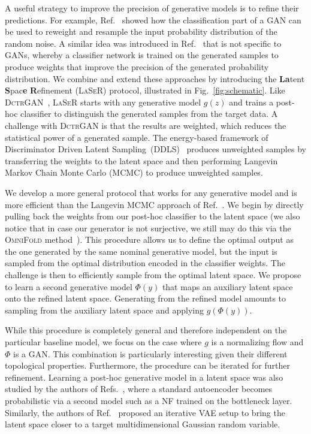 A useful strategy to improve the precision of generative models is to refine their predictions. For example, Ref.~\cite{che2020gan} showed how the classification part of a GAN can be used to reweight and resample the input probability distribution of the random noise. A similar idea was introduced in Ref.~\cite{2009.03796} that is not specific to GANs, whereby a classifier network is trained on the generated samples to produce weights that improve the precision of the generated probability distribution. 
We combine and extend these approaches by introducing the \textbf{La}tent \textbf{S}pac\textbf{e} \textbf{R}efinement (\textsc{LaSeR}) protocol, illustrated in Fig.~\ref{fig:schematic}. 
Like \textsc{DctrGAN}~\cite{2009.03796,Andreassen:2019nnm}, \textsc{LaSeR} starts with any generative model $g(z)$ and trains a post-hoc classifier to distinguish the generated samples from the target data. 
A challenge with \textsc{DctrGAN} is that the results are weighted, which reduces the statistical power of a generated sample. 
The energy-based framework of Discriminator Driven Latent Sampling~(DDLS)~\cite{che2020gan} produces unweighted samples by transferring the weights to the latent space and then performing Langevin Markov Chain Monte Carlo (MCMC) to produce unweighted samples.  

We develop a more general protocol that works for any generative model and is more efficient than the Langevin MCMC approach of Ref.~\cite{che2020gan}. 
We begin by directly pulling back the weights from our post-hoc classifier to the latent space (we also notice that in case our generator is not surjective, we still may do this via the \textsc{OmniFold} method~\cite{Andreassen:2019cjw}). This procedure allows us to define the optimal output as the one generated by the same nominal generative model, but the input is sampled from the optimal distribution encoded in the classifier weights. The challenge is then to efficiently sample from the optimal latent space.
We propose to learn a second generative model $\Phi(y)$ that maps an auxiliary latent space onto the refined latent space. Generating from the refined model amounts to sampling from the auxiliary latent space and applying $g(\Phi(y))$. 

While this procedure is completely general and therefore independent on the particular baseline model, we focus on the case where $g$ is a normalizing flow and $\Phi$ is a GAN. This combination is particularly interesting given their different topological properties.
Furthermore, the procedure can be iterated for further refinement.  Learning a post-hoc generative model in a latent space was also studied by the authors of Refs.~\cite{bohm2020probabilistic,GMMN,xiao2019generative}, where a standard autoencoder becomes probabilistic via a second model such as a NF trained on the bottleneck layer. Similarly, the authors of Ref.~\cite{dai2018diagnosing} proposed an iterative VAE setup to bring the latent space closer to a target multidimensional Gaussian random variable.

